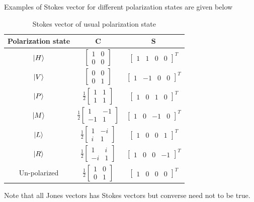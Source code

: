 \documentclass[11pt,a4paper]{article}
\numberwithin{equation}{section}
\begin{document}
Examples of Stokes vector for different polarization states are given below
\begin{table}[H]
	\centering
	\begin{tabular}{ c c c } 
		\hline
		\hline
		Polarization state &  $\boldsymbol{C}$ & $\boldsymbol{S}$\\
		\hline
		$\ket{H}$ & $\begin{bmatrix}1&0\\0&0\end{bmatrix}$ & $\begin{bmatrix}1&1&0&0\end{bmatrix}^T$\\ \hline
		$\ket{V}$ & $\begin{bmatrix}0&0\\0&1\end{bmatrix}$ & $\begin{bmatrix}1&-1&0&0\end{bmatrix}^T$\\ \hline
		$\ket{P}$ & $\frac{1}{2}\begin{bmatrix}1&1\\1&1\end{bmatrix}$ & $\begin{bmatrix}1&0&1&0\end{bmatrix}^T$\\ \hline
		$\ket{M}$ & $\frac{1}{2}\begin{bmatrix}1&-1\\-1&1\end{bmatrix}$ & $\begin{bmatrix}1&0&-1&0\end{bmatrix}^T$\\ \hline
		$\ket{L}$ & $\frac{1}{2}\begin{bmatrix}1&-i\\i&1\end{bmatrix}$ & $\begin{bmatrix}1&0&0&1\end{bmatrix}^T$\\ \hline
		$\ket{R}$ & $\frac{1}{2}\begin{bmatrix}1&i\\-i&1\end{bmatrix}$ & $\begin{bmatrix}1&0&0&-1\end{bmatrix}^T$\\ \hline
		Un-polarized &  $\frac{1}{2}\begin{bmatrix}1&0\\0&1\end{bmatrix}$ & $\begin{bmatrix}1&0&0&0\end{bmatrix}^T$\\
		\hline
		\hline
	\end{tabular}
	\caption{Stokes vector of usual polarization state}
	\label{table:4}
\end{table}
Note that all Jones vectors has Stokes vectors but converse need not to be true.
\end{document}
